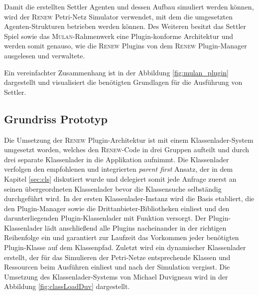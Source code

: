 		Damit die erstellten Settler Agenten und dessen Aufbau simuliert werden können, wird der \textsc{Renew} Petri-Netz Simulator verwendet, mit dem die umgesetzten Agenten-Strukturen betrieben werden können.\newline
		Des Weiteren besitzt das Settler Spiel sowie das \textsc{Mulan}-Rahmenwerk eine Plugin-konforme Architektur und werden somit genauso, wie die \textsc{Renew} Plugins von dem \textsc{Renew} Plugin-Manager ausgelesen und verwaltete.\bigbreak

		Ein vereinfachter Zusammenhang ist in der Abbildung \ref{fig:mulan_plugin} dargestellt und visualisiert die benötigten Grundlagen für die Ausführung von Settler.


	\subsection{Grundriss Prototyp} \label{sec:zustandRNW}
		Die Umsetzung der \textsc{Renew} Plugin-Architektur ist mit einem Klassenlader-System umgesetzt worden, welches den \textsc{Renew}-Code in drei Gruppen aufteilt und durch drei separate Klassenlader in die Applikation aufnimmt. Die Klassenlader verfolgen den empfohlenen und integrierten \textit{parent first} Ansatz, der in dem Kapitel \ref{sec:cls} diskutiert wurde und delegiert somit jede Anfrage zuerst an seinen übergeordneten Klassenlader bevor die Klassensuche selbständig durchgeführt wird. \newline
		In der ersten Klassenlader-Instanz wird die Basis etabliert, die den Plugin-Manager sowie die Drittanbieter-Bibliotheken einliest und den darunterliegenden Plugin-Klassenlader mit Funktion versorgt. Der Plugin-Klassenlader lädt anschließend alle Plugins nacheinander in der richtigen Reihenfolge ein und garantiert zur Laufzeit das Vorkommen jeder benötigten Plugin-Klasse auf dem Klassenpfad. Zuletzt wird ein dynamischer Klassenlader erstellt, der für das Simulieren der Petri-Netze entsprechende Klassen und Ressourcen beim Ausführen einliest und nach der Simulation vergisst. \newline
		Die Umsetzung des Klassenlader-Systems von Michael Duvigneau wird in der Abbildung \ref{fig:classLoadDuv} dargestellt. \bigbreak
